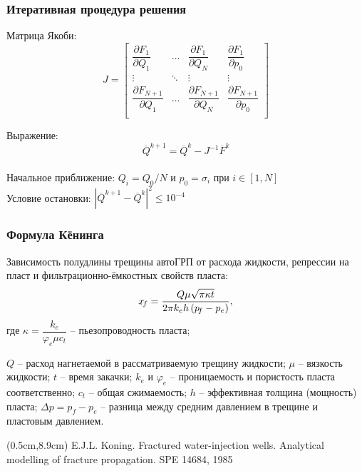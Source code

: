 \documentclass{beamer}
\begin{document}
\begin{frame}
\frametitle{Итеративная процедура решения}
Матрица Якоби:
$$J = \begin{bmatrix}
	\dfrac{\partial F_1}{\partial Q_1} & \dots & \dfrac{\partial F_1}{\partial Q_N} & \dfrac{\partial F_1}{\partial p_0} \\
	\vdots & \ddots & \vdots & \vdots \\
	\dfrac{\partial F_{N+1}}{\partial Q_1} & \dots & \dfrac{\partial F_{N+1}}{\partial Q_N} & \dfrac{\partial F_{N+1}}{\partial p_0} \\
	\end{bmatrix}
$$

Выражение:
$$\overline{Q}^{k+1}=\overline{Q}^k-J^{-1}\overline{F}^k$$
\ \\

Начальное приближение:
$Q_i=Q_0/N\text{ и }p_0=\sigma_i\text{ при } i\in\left[1,N\right]$
\ \\

Условие остановки:
$\left|\overline{Q}^{k+1}-\overline{Q}^k\right|^2\leqslant10^{-4}$

\end{frame}





\begin{frame}
\frametitle{Формула Кёнинга}
Зависимость полудлины трещины автоГРП от расхода жидкости, репрессии на пласт и фильтрационно-ёмкостных свойств пласта:
$$
x_{\!f}=\frac{Q\mu\sqrt{\pi\kappa t}}{2\pi k_eh\left(p_{\!f}-p_e\right)},
\vspace*{-3mm}
$$
\small
где
$\kappa=\dfrac{k_e}{\varphi_e\mu c_t}$ -- пьезопроводность пласта;\newline

$Q$ -- расход нагнетаемой в рассматриваемую трещину жидкости;\newline
$\mu$ -- вязкость жидкости;\newline
$t$ -- время закачки;
$k_e$ и $\varphi_e$ -- проницаемость и пористость пласта соответственно;
$c_t$ -- общая сжимаемость;
$h$ -- эффективная толщина (мощность) пласта;
$\Delta p=p_f-p_e$ -- разница между средним давлением в трещине и пластовым давлением.
\normalsize

\begin{textblock*}{6cm}(0.5cm,8.9cm)
\tiny
\textcolor{lit_gray}{E.J.L. Koning. Fractured water-injection wells. Analytical modelling of fracture propagation. SPE 14684, 1985}
\end{textblock*}

\normalsize


\end{frame}
\end{document}
